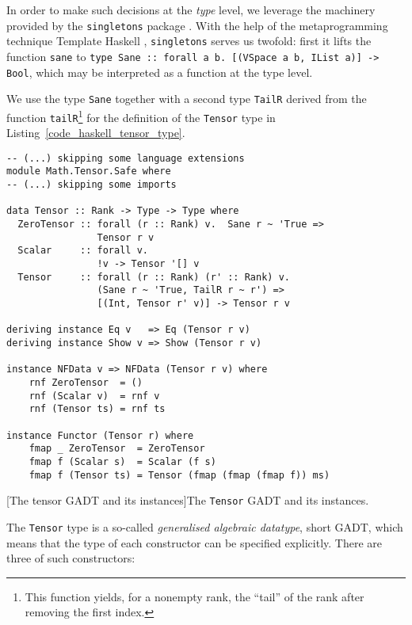 In order to make such decisions at the \emph{type} level, we leverage the machinery provided by the \texttt{singletons} package \cite{Eisenberg_2012}. With the help of the metaprogramming technique Template Haskell \cite{Sheard_2002}, \texttt{singletons} serves us twofold: first it lifts the function \texttt{sane} to \texttt{type Sane :: forall a b. [(VSpace a b, IList a)] -> Bool}, which may be interpreted as a function at the type level.

We use the type \texttt{Sane} together with a second type \texttt{TailR} derived from the function \texttt{tailR}\footnote{This function yields, for a nonempty rank, the ``tail'' of the rank after removing the first index.} for the definition of the \texttt{Tensor} type in Listing~\ref{code_haskell_tensor_type}.
\begin{code}
  \begin{verbatim}
-- (...) skipping some language extensions
module Math.Tensor.Safe where
-- (...) skipping some imports

data Tensor :: Rank -> Type -> Type where
  ZeroTensor :: forall (r :: Rank) v.  Sane r ~ 'True =>
                Tensor r v
  Scalar     :: forall v.
                !v -> Tensor '[] v
  Tensor     :: forall (r :: Rank) (r' :: Rank) v.
                (Sane r ~ 'True, TailR r ~ r') =>
                [(Int, Tensor r' v)] -> Tensor r v

deriving instance Eq v   => Eq (Tensor r v)
deriving instance Show v => Show (Tensor r v)

instance NFData v => NFData (Tensor r v) where
    rnf ZeroTensor  = ()
    rnf (Scalar v)  = rnf v
    rnf (Tensor ts) = rnf ts

instance Functor (Tensor r) where
    fmap _ ZeroTensor  = ZeroTensor
    fmap f (Scalar s)  = Scalar (f s)
    fmap f (Tensor ts) = Tensor (fmap (fmap (fmap f)) ms)
  \end{verbatim}
  [The tensor GADT and its instances]{The \texttt{Tensor} GADT and its instances.}
  \label{code_haskell_tensor_type}
\end{code}
The \texttt{Tensor} type is a so-called \emph{generalised algebraic datatype}, short GADT, which means that the type of each constructor can be specified explicitly. There are three of such constructors:
